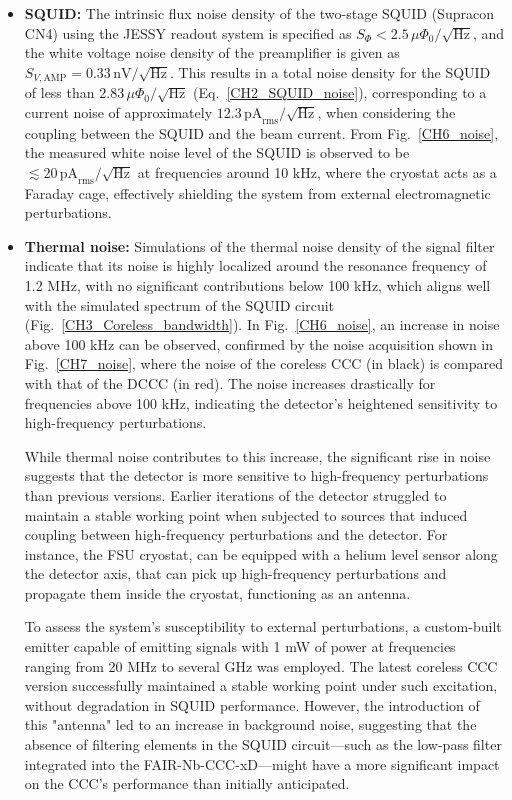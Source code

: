 \documentclass[12pt,a4paper]{report}
\begin{document}
        \begin{itemize}
        	\item \textbf{SQUID:} The intrinsic flux noise density of the two-stage SQUID (Supracon CN4) using the JESSY readout system is specified as $S_\Phi < 2.5 \, \mu\Phi_0/\sqrt{\text{Hz}}$, and the white voltage noise density of the preamplifier is given as $S_{V,\text{AMP}} = 0.33 \, \text{nV}/\sqrt{\text{Hz}}$. This results in a total noise density for the SQUID of less than $2.83 \, \mu\Phi_0/\sqrt{\text{Hz}}$ (Eq.~\ref{CH2_SQUID_noise}), corresponding to a current noise of approximately $12.3 \, \text{pA}_{\text{rms}}/\sqrt{\text{Hz}}$, when considering the coupling between the SQUID and the beam current. From Fig.~\ref{CH6_noise}, the measured white noise level of the SQUID is observed to be $\lesssim 20 \, \text{pA}_{\text{rms}}/\sqrt{\text{Hz}}$ at frequencies around 10 kHz, where the cryostat acts as a Faraday cage, effectively shielding the system from external electromagnetic perturbations.
        	
        	\item \textbf{Thermal noise:} Simulations of the thermal noise density of the signal filter \cite{DavidThesis} indicate that its noise is highly localized around the resonance frequency of 1.2 MHz, with no significant contributions below 100 kHz, which aligns well with the simulated spectrum of the SQUID circuit (Fig.~\ref{CH3_Coreless_bandwidth}). In Fig.~\ref{CH6_noise}, an increase in noise above 100 kHz can be observed, confirmed by the noise acquisition shown in Fig.~\ref{CH7_noise}, where the noise of the coreless CCC (in black) is compared with that of the DCCC (in red). The noise increases drastically for frequencies above 100 kHz, indicating the detector's heightened sensitivity to high-frequency perturbations.
        	
        	While thermal noise contributes to this increase, the significant rise in noise suggests that the detector is more sensitive to high-frequency perturbations than previous versions. Earlier iterations of the detector struggled to maintain a stable working point when subjected to sources that induced coupling between high-frequency perturbations and the detector. For instance, the FSU cryostat, can be equipped with a helium level sensor along the detector axis, that can pick up high-frequency perturbations and propagate them inside the cryostat, functioning as an antenna.
        	
        	To assess the system's susceptibility to external perturbations, a custom-built emitter capable of emitting signals with 1 mW of power at frequencies ranging from 20 MHz to several GHz was employed. The latest coreless CCC version successfully maintained a stable working point under such excitation, without degradation in SQUID performance. However, the introduction of this "antenna" led to an increase in background noise, suggesting that the absence of filtering elements in the SQUID circuit—such as the low-pass filter integrated into the FAIR-Nb-CCC-xD—might have a more significant impact on the CCC's performance than initially anticipated. 
        	

\end{itemize}
\end{document}

